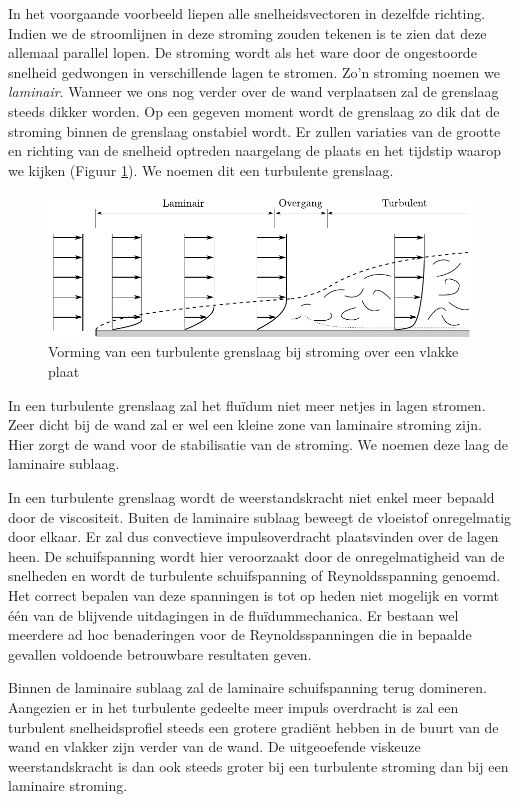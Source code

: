 In het voorgaande voorbeeld liepen alle snelheidsvectoren in dezelfde richting. Indien we de stroomlijnen in deze stroming zouden tekenen is te zien dat deze allemaal parallel lopen. De stroming wordt als het ware door de ongestoorde snelheid gedwongen in verschillende lagen te stromen. Zo'n stroming noemen we \emph{laminair}. Wanneer we ons nog verder over de wand verplaatsen zal de grenslaag steeds dikker worden. Op een gegeven moment wordt de grenslaag zo dik dat de stroming binnen de grenslaag onstabiel wordt. Er zullen variaties van de grootte en richting van de snelheid optreden naargelang de plaats en het tijdstip waarop we kijken (Figuur \ref{fig:Turbulente grenslaag}). We noemen dit een turbulente grenslaag.
\begin{figure}[htb]
	\centering
	\includegraphics{fig/uitwendige_stroming/Turbulente_grenslaag}
	\caption{Vorming van een turbulente grenslaag bij stroming over een vlakke plaat}
	\label{fig:Turbulente grenslaag}
\end{figure}

In een turbulente grenslaag zal het fluïdum niet meer netjes in lagen stromen. Zeer dicht bij de wand zal er wel een kleine zone van laminaire stroming zijn. Hier zorgt de wand voor de stabilisatie van de stroming. We noemen deze laag de laminaire sublaag.

In een turbulente grenslaag wordt de weerstandskracht niet enkel meer bepaald door de viscositeit. Buiten de laminaire sublaag beweegt de vloeistof onregelmatig door elkaar. Er zal dus convectieve impulsoverdracht plaatsvinden over de lagen heen. De schuifspanning wordt hier veroorzaakt door de onregelmatigheid van de snelheden en wordt de turbulente schuifspanning of Reynoldsspanning genoemd. Het correct bepalen van deze spanningen is tot op heden niet mogelijk en vormt één van de blijvende uitdagingen in de fluïdummechanica. Er bestaan wel meerdere ad hoc benaderingen voor de Reynoldsspanningen die in bepaalde gevallen voldoende betrouwbare resultaten geven.

Binnen de laminaire sublaag zal de laminaire schuifspanning terug domineren. Aangezien er in het turbulente gedeelte meer impuls overdracht is zal een turbulent snelheidsprofiel steeds een grotere gradiënt hebben in de buurt van de wand en vlakker zijn verder van de wand. De uitgeoefende viskeuze weerstandskracht is dan ook steeds groter bij een turbulente stroming dan bij een laminaire stroming.



